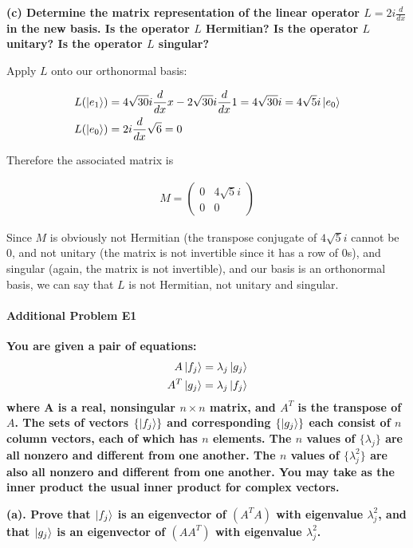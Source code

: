 \documentclass{article}
\begin{document}
\textbf{(c) Determine the matrix representation of the linear operator $L = 2i\frac{d}{dx}$ in the new basis. Is the operator $L$ Hermitian? Is the operator $L$ unitary? Is the operator $L$ singular?}

Apply $L$ onto our orthonormal basis:

\begin{align}
    L(\ket{e_1}) &= 4\sqrt{30}i \frac{d}{dx}x - 2\sqrt{30}i \frac{d}{dx} 1  = 4\sqrt{30}i = 4 \sqrt{5}i \ket{e_0} \\
    L(\ket{e_0}) &= 2i \frac{d}{dx} \sqrt{6} = 0
\end{align}

Therefore the associated matrix is 

\begin{align}
    M = \begin{pmatrix}
        0 & 4\sqrt{5}i \\
        0 & 0
    \end{pmatrix}
\end{align}

Since $M$ is obviously not Hermitian (the transpose conjugate of $4\sqrt{5}i$ cannot be 0, and not unitary (the matrix is not invertible since it has a row of 0s), and singular (again, the matrix is not invertible), and our basis is an orthonormal basis, we can say that $L$ is not Hermitian, not unitary and singular.

\paragraph{Additional Problem E1}

\textbf{You are given a pair of equations:}
\begin{align*}
    A \ket{f_j} = \lambda_j \ket{g_j} \\
    A^T \ket{g_j} = \lambda_j \ket{f_j}
\end{align*}
\textbf{where A is a real, nonsingular $n \times n$ matrix, and $A^T$ is the transpose of $A$. The sets of vectors $\{\ket{f_j}\}$ and corresponding $\{\ket{g_j}\}$ each consist of $n$ column vectors, each of which has $n$ elements. The $n$ values of $\{\lambda_j\}$ are all nonzero and different from one another. The $n$ values of $\{\lambda^2_j\}$ are also all nonzero and different from one another. You may take as the inner product the usual inner product for complex vectors.}

\textbf{(a). Prove that $\ket{f_j}$ is an eigenvector of $(A^TA)$ with eigenvalue $\lambda^2_j$, and that $\ket{g_j}$ is an eigenvector of $(A A^T)$ with eigenvalue $\lambda^2_j$. }
\end{document}
